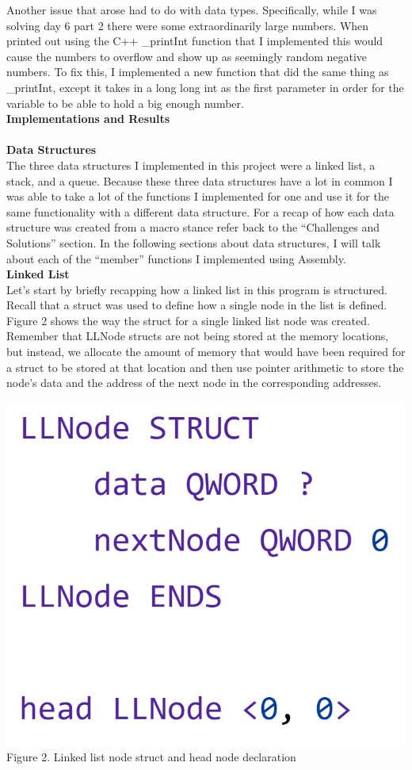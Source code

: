 \documentclass[twoside]{article}
\begin{document}
\noindent Another issue that arose had to do with data types. Specifically, while I was solving day 6 part 2 there were some extraordinarily large numbers. When printed out using the C++ \_printInt function that I implemented this would cause the numbers to overflow and show up as seemingly random negative numbers. To fix this, I implemented a new function that did the same thing as \_printInt, except it takes in a long long int as the first parameter in order for the variable to be able to hold a big enough number. \\

\noindent \textbf{\Large Implementations and Results} \\\\
\noindent \textbf{\Large Data Structures} \\
\noindent The three data structures I implemented in this project were a linked list, a stack, and a queue. Because these three data structures have a lot in common I was able to take a lot of the functions I implemented for one and use it for the same functionality with a different data structure. For a recap of how each data structure was created from a macro stance refer back to the “Challenges and Solutions” section. In the following sections about data structures, I will talk about each of the “member” functions I implemented using Assembly.\\

\noindent \textbf{\Large Linked List} \\
\noindent Let’s start by briefly recapping how a linked list in this program is structured. Recall that a struct was used to define how a single node in the list is defined. Figure 2 shows the way the struct for a single linked list node was created. Remember that LLNode structs are not being stored at the memory locations, but instead, we allocate the amount of memory that would have been required for a struct to be stored at that location and then use pointer arithmetic to store the node’s data and the address of the next node in the corresponding addresses. \\
\begin{center}
    \includegraphics[width=.25\textwidth]{images/LLNodeStruct.png}\\
    Figure 2. Linked list node struct and head node declaration
\end{center}
\end{document}
